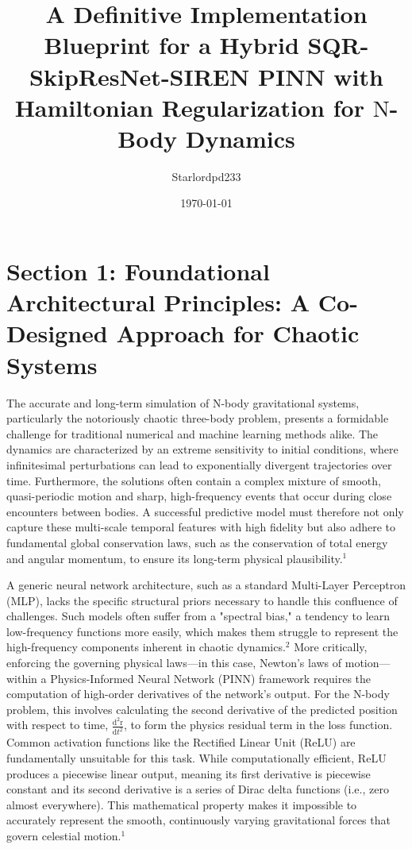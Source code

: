 \documentclass{article}
\title{A Definitive Implementation Blueprint for a Hybrid SQR-SkipResNet-SIREN PINN with Hamiltonian Regularization for $\mathrm{N}$-Body Dynamics}
\date{\today}
\author{Starlordpd233}
\begin{document}
\maketitle

\section{Section 1: Foundational Architectural Principles: A Co-Designed Approach for Chaotic Systems}

The accurate and long-term simulation of $\mathrm{N}$-body gravitational systems, particularly the notoriously chaotic three-body problem, presents a formidable challenge for traditional numerical and machine learning methods alike. The dynamics are characterized by an extreme sensitivity to initial conditions, where infinitesimal perturbations can lead to exponentially divergent trajectories over time. Furthermore, the solutions often contain a complex mixture of smooth, quasi-periodic motion and sharp, high-frequency events that occur during close encounters between bodies. A successful predictive model must therefore not only capture these multi-scale temporal features with high fidelity but also adhere to fundamental global conservation laws, such as the conservation of total energy and angular momentum, to ensure its long-term physical plausibility.$^1$

A generic neural network architecture, such as a standard Multi-Layer Perceptron (MLP), lacks the specific structural priors necessary to handle this confluence of challenges. Such models often suffer from a "spectral bias," a tendency to learn low-frequency functions more easily, which makes them struggle to represent the high-frequency components inherent in chaotic dynamics.$^2$ More critically, enforcing the governing physical laws—in this case, Newton's laws of motion—within a Physics-Informed Neural Network (PINN) framework requires the computation of high-order derivatives of the network's output. For the $\mathrm{N}$-body problem, this involves calculating the second derivative of the predicted position with respect to time, $\frac{\mathrm{d}^2 \mathrm{r}}{\mathrm{d} t^2}$, to form the physics residual term in the loss function. Common activation functions like the Rectified Linear Unit (ReLU) are fundamentally unsuitable for this task. While computationally efficient, ReLU produces a piecewise linear output, meaning its first derivative is piecewise constant and its second derivative is a series of Dirac delta functions (i.e., zero almost everywhere). This mathematical property makes it impossible to accurately represent the smooth, continuously varying gravitational forces that govern celestial motion.$^1$
\end{document}
